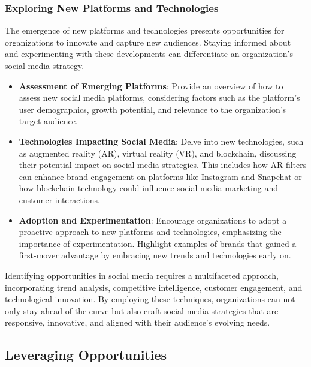 \documentclass[
]{book}
\providecommand{\tightlist}{%
  \setlength{\itemsep}{0pt}\setlength{\parskip}{0pt}}
\begin{document}
\hypertarget{exploring-new-platforms-and-technologies}{%
\subsubsection*{Exploring New Platforms and Technologies}\label{exploring-new-platforms-and-technologies}}

The emergence of new platforms and technologies presents opportunities for organizations to innovate and capture new audiences. Staying informed about and experimenting with these developments can differentiate an organization's social media strategy.

\begin{itemize}
\tightlist
\item
  \textbf{Assessment of Emerging Platforms}: Provide an overview of how to assess new social media platforms, considering factors such as the platform's user demographics, growth potential, and relevance to the organization's target audience.
\item
  \textbf{Technologies Impacting Social Media}: Delve into new technologies, such as augmented reality (AR), virtual reality (VR), and blockchain, discussing their potential impact on social media strategies. This includes how AR filters can enhance brand engagement on platforms like Instagram and Snapchat or how blockchain technology could influence social media marketing and customer interactions.
\item
  \textbf{Adoption and Experimentation}: Encourage organizations to adopt a proactive approach to new platforms and technologies, emphasizing the importance of experimentation. Highlight examples of brands that gained a first-mover advantage by embracing new trends and technologies early on.
\end{itemize}

Identifying opportunities in social media requires a multifaceted approach, incorporating trend analysis, competitive intelligence, customer engagement, and technological innovation. By employing these techniques, organizations can not only stay ahead of the curve but also craft social media strategies that are responsive, innovative, and aligned with their audience's evolving needs.

\hypertarget{leveraging-opportunities}{%
\subsection*{Leveraging Opportunities}\label{leveraging-opportunities}}
\end{document}
